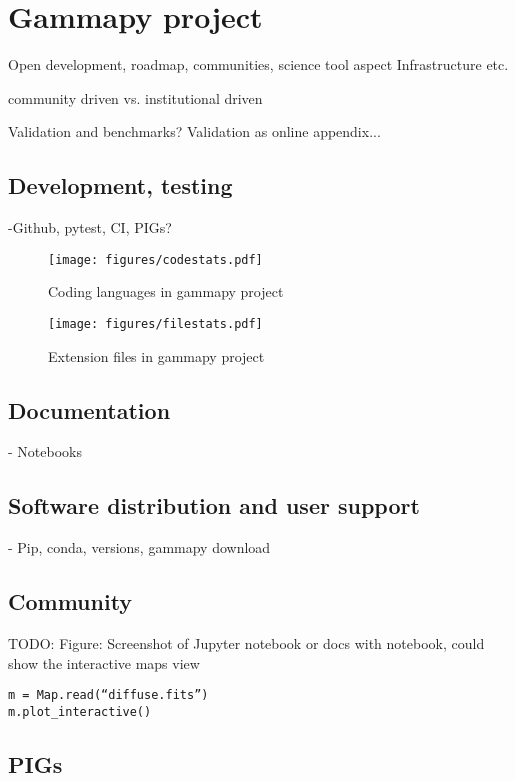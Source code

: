 \section{Gammapy project}
\label{sec:gammapy-project}

Open development, roadmap, communities, science tool aspect Infrastructure etc.

community driven vs. institutional driven

Validation and benchmarks? Validation as online appendix...

\subsection{Development, testing}
\label{ssec:development-testing}
-Github, pytest, CI, PIGs?



\begin{figure}[t]
	\centering
	\texttt{[image: figures/codestats.pdf]}
    \caption{
        Coding languages in gammapy project
    }
	\label{fig:codestats:lang}
\end{figure}

\begin{figure}[t]
	\centering
	\texttt{[image: figures/filestats.pdf]}
    \caption{
        Extension files in gammapy project
    }
	\label{fig:codestats:file}
\end{figure}

\subsection{Documentation}
\label{ssec:documentation}

- Notebooks

\subsection{Software distribution and user support}
\label{ssec:software-distribution-and-user-support}
- Pip, conda, versions, gammapy download

\subsection{Community}
\label{ssec:community}
TODO: Figure: Screenshot of Jupyter notebook or docs with notebook, could show
the interactive maps view
\begin{verbatim}
m = Map.read(“diffuse.fits”)
m.plot_interactive()
\end{verbatim}

\subsection{PIGs}
\label{ssec:pigs}
